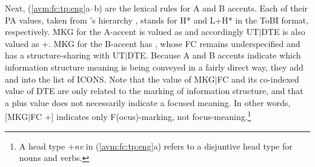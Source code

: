 



Next, (\ref{avm:fc:tp:eng}a--b) are the lexical rules for A and B
accents. Each of their PA values, taken from
\citeauthor{bildhauer:07}'s hierarchy
, stands for H* and L+H* in the ToBI
format, respectively. MKG for the A-accent
is valued as  and accordingly UT{$\mid$}DTE is also
valued as +. MKG for the B-accent has , whose FC remains
underspecified and has a structure-sharing with
UT{$\mid$}DTE. Because A and B accents indicate
which information structure meaning is being conveyed in a fairly
direct way, they add  and 
into the list of ICONS. Note that the value of MKG{$\mid$}FC and its
co-indexed value of DTE are only related to the marking of information
structure, and that a plus value does not necessarily indicate a
focused meaning. In other words, [MKG{$\mid$}FC +] indicates only
F(ocus)-marking, not focus-meaning.\footnote{A head type +\textit{nv}
  in (\ref{avm:fc:tp:eng}a) refers to a disjuntive head type for nouns
  and verbs.}
 


